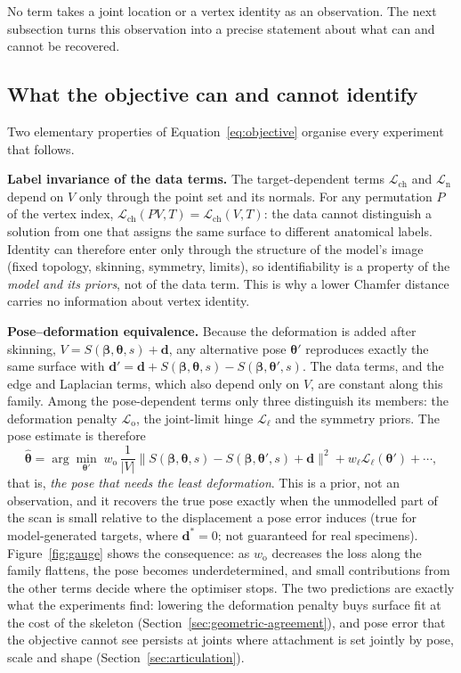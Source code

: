 No term takes a joint location or a vertex identity as an observation. The
next subsection turns this observation into a precise statement about what can
and cannot be recovered.

\subsection{What the objective can and cannot identify}
\label{sec:formal}

Two elementary properties of Equation~\eqref{eq:objective} organise every
experiment that follows.

\textbf{Label invariance of the data terms.} The target-dependent terms
$\mathcal L_{\mathrm{ch}}$ and $\mathcal L_{\mathrm n}$ depend on $V$ only through
the point set and its normals. For any permutation $P$ of the vertex index,
$\mathcal L_{\mathrm{ch}}(PV,T)=\mathcal L_{\mathrm{ch}}(V,T)$: the data cannot
distinguish a solution from one that assigns the same surface to different
anatomical labels. Identity can therefore enter only through the structure of
the model's image (fixed topology, skinning, symmetry, limits), so
identifiability is a property of the \emph{model and its priors}, not of the
data term. This is why a lower Chamfer distance carries no information about
vertex identity.

\textbf{Pose--deformation equivalence.} Because the deformation is added after
skinning, $V=S(\bm\beta,\bm\theta,s)+\mathbf d$, any alternative pose
$\bm\theta'$ reproduces exactly the same surface with
$\mathbf d'=\mathbf d+S(\bm\beta,\bm\theta,s)-S(\bm\beta,\bm\theta',s)$. The
data terms, and the edge and Laplacian terms, which also depend only on $V$,
are constant along this family. Among the pose-dependent terms only three
distinguish its members: the deformation penalty $\mathcal L_{\mathrm o}$, the
joint-limit hinge $\mathcal L_{\ell}$ and the symmetry priors. The pose
estimate is therefore
\begin{equation}
\hat{\bm\theta}=\arg\min_{\bm\theta'}\;w_{\mathrm o}\,\frac1{|V|}\big\|S(\bm\beta,\bm\theta,s)-S(\bm\beta,\bm\theta',s)+\mathbf d\big\|^2+w_{\ell}\mathcal L_{\ell}(\bm\theta')+\cdots,
\label{eq:gauge}
\end{equation}
that is, \emph{the pose that needs the least deformation}. This is a prior,
not an observation, and it recovers the true pose exactly when the unmodelled
part of the scan is small relative to the displacement a pose error induces
(true for model-generated targets, where $\mathbf d^\ast=0$; not guaranteed for
real specimens). Figure~\ref{fig:gauge} shows the consequence: as
$w_{\mathrm o}$ decreases the loss along the family flattens, the pose becomes
underdetermined, and small contributions from the other terms decide where
the optimiser stops. The two predictions are exactly what the experiments find:
lowering the deformation penalty buys surface fit at the cost of the skeleton
(Section~\ref{sec:geometric-agreement}), and pose error that the objective
cannot see persists at joints where attachment is set jointly by pose, scale and
shape (Section~\ref{sec:articulation}).

